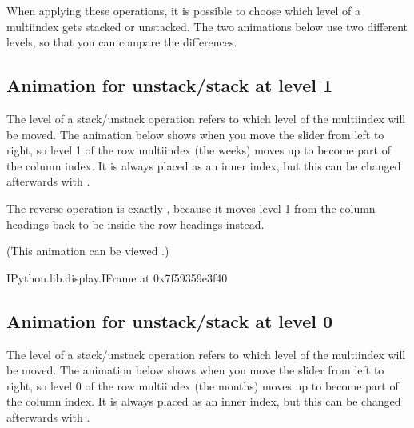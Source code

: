 \documentclass[letterpaper,10pt,english]{jupyterBook}
\begin{document}
\sphinxAtStartPar
When applying these operations, it is possible to choose which level of a multi\sphinxhyphen{}index gets stacked or unstacked.  The two animations below use two different levels, so that you can compare the differences.


\subsection{Animation for unstack/stack at level 1}
\label{\detokenize{chapter-6-single-table-verbs:animation-for-unstack-stack-at-level-1}}
\sphinxAtStartPar
The level of a stack/unstack operation refers to which level of the multi\sphinxhyphen{}index will be moved.  The animation below shows  when you move the slider from left to right, so level 1 of the row multi\sphinxhyphen{}index (the weeks) moves up to become part of the column index.  It is always placed as an inner index, but this can be changed afterwards with .

\sphinxAtStartPar
The reverse operation is exactly , because it moves level 1 from the column headings back to be inside the row headings instead.

\sphinxAtStartPar
(This animation can be viewed .)

\begin{sphinxVerbatim}[commandchars=\\\{\}]
\PYGZlt{}IPython.lib.display.IFrame at 0x7f59359e3f40\PYGZgt{}
\end{sphinxVerbatim}


\subsection{Animation for unstack/stack at level 0}
\label{\detokenize{chapter-6-single-table-verbs:animation-for-unstack-stack-at-level-0}}
\sphinxAtStartPar
The level of a stack/unstack operation refers to which level of the multi\sphinxhyphen{}index will be moved.  The animation below shows  when you move the slider from left to right, so level 0 of the row multi\sphinxhyphen{}index (the months) moves up to become part of the column index.  It is always placed as an inner index, but this can be changed afterwards with .
\end{document}
